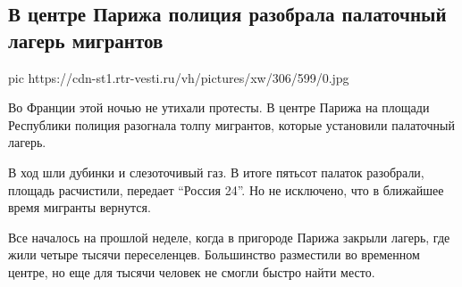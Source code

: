  
 
 
 
 
 
\subsection{В центре Парижа полиция разобрала палаточный лагерь мигрантов}
\label{sec:24_11_2020.news.ru.vesti.1.migranty_paris}

\ifcmt
pic https://cdn-st1.rtr-vesti.ru/vh/pictures/xw/306/599/0.jpg
\fi

Во Франции этой ночью не утихали протесты. В центре Парижа на площади
Республики полиция разогнала толпу мигрантов, которые установили палаточный
лагерь.

В ход шли дубинки и слезоточивый газ. В итоге пятьсот палаток разобрали,
площадь расчистили, передает \enquote{Россия 24}. Но не исключено, что в ближайшее
время мигранты вернутся.

Все началось на прошлой неделе, когда в пригороде Парижа закрыли лагерь, где
жили четыре тысячи переселенцев. Большинство разместили во временном центре, но
еще для тысячи человек не смогли быстро найти место.

